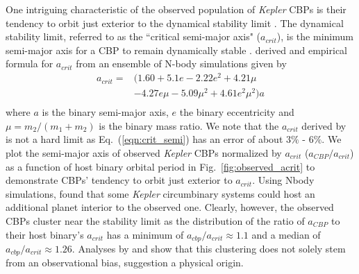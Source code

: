 One intriguing characteristic of the observed population of {\it Kepler} CBPs is their tendency to orbit just exterior to the dynamical stability limit \citep{Welsh2014,Winn2015}.  The dynamical stability limit, referred to as the ``critical semi-major axis" ($a_{crit}$), is the minimum semi-major axis for a CBP to remain dynamically stable \citep{Dvorak1989,Holman1999}.  \citet{Holman1999} derived and empirical formula for $a_{crit}$ from an ensemble of N-body simulations given by
\begin{equation}
\begin{split} \label{eqn:crit_semi}
a_{crit} = & (1.60 + 5.1e -2.22 e^2 + 4.21 \mu \\
& -4.27e \mu -5.09 \mu^2 + 4.61 e^2 \mu^2) a \\
\end{split}
\end{equation}
where $a$ is the binary semi-major axis, $e$ the binary eccentricity and $\mu = m_2 / (m_1 + m_2)$ is the binary mass ratio.  We note that the $a_{crit}$ derived by \citet{Holman1999} is not a hard limit as Eq.~(\ref{eqn:crit_semi}) has an error of about $3\%$ - $6\%$. We plot the semi-major axis of observed {\it Kepler} CBPs normalized by $a_{crit}$ ($a_{CBP}/a_{crit}$) as a function of host binary orbital period in Fig.~\ref{fig:observed_acrit} to demonstrate CBPs' tendency to orbit just exterior to $a_{crit}$.  Using Nbody simulations, \citet{Quarles2018} found that some {\it Kepler} circumbinary systems could host an additional planet interior to the observed one.  Clearly, however, the observed CBPs cluster near the stability limit as the distribution of the ratio of $a_{CBP}$ to their host binary's $a_{crit}$ has a minimum of $a_{cbp}/a_{crit}{\approx} 1.1$ and a median of $a_{cbp}/a_{crit}{\approx} 1.26$. Analyses by \citet{Martin2014} and \citet{Li2016} show that this clustering does not solely stem from an observational bias, suggestion a physical origin.

